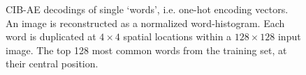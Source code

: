 \begin{figure}
    \caption{CIB-AE decodings of single `words', i.e. one-hot encoding vectors. An image is reconstructed as a normalized word-histogram.
             \protect{} Each word is duplicated at $4 \times 4$ spatial locations within a $128 \times 128$ input image.
             \protect{} The top 128 most common words from the training set, at their central position.}
    \label{fig:cibae-words}
\end{figure}

